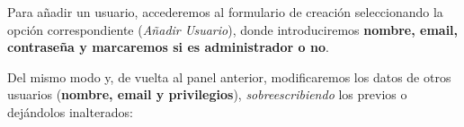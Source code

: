 
Para añadir un usuario, accederemos al formulario de creación seleccionando la opción correspondiente (\textit{Añadir Usuario}), donde introduciremos \textbf{nombre, email, contraseña y marcaremos si es administrador o no}.


Del mismo modo y, de vuelta al panel anterior, modificaremos los datos de otros usuarios (\textbf{nombre, email y privilegios}), \textit{sobreescribiendo} los previos o dejándolos inalterados:

